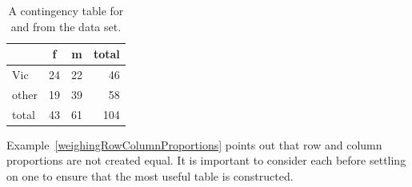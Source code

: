 
\begin{table}[ht]
\centering
\begin{tabular}{l cc r}
  \hline
 & f & m & total \\ 
  \hline
Vic &  24 &  22 & 46 \\ 
  other &  19 &  39 & 58 \\ 
   \hline
total & 43 & 61 & 104 \\
   \hline
\end{tabular}
\caption{A contingency table for  and  from the  data set.}
\label{possumPopSexContTable}
\end{table}

Example~\ref{weighingRowColumnProportions} points out that row and column proportions are not created equal. It is important to consider each before settling on one to ensure that the most useful table is constructed.

